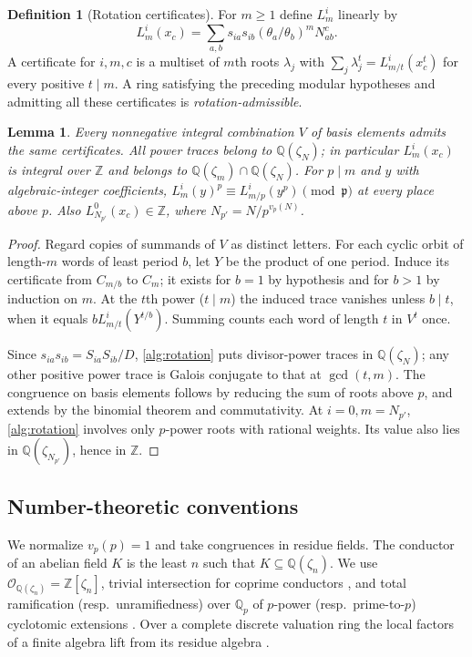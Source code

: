 \documentclass[11pt]{amsart}
\numberwithin{equation}{section}
\newtheorem{lemma}[theorem]{Lemma}
\theoremstyle{definition}
\newtheorem{definition}[theorem]{Definition}
\theoremstyle{plain}
\newcommand{\QQ}{\mathbb Q}
\newcommand{\ZZ}{\mathbb Z}
\begin{document}
\begin{definition}[Rotation certificates]\label{alg:rot-data}
For $m\ge1$ define $L_m^i$ linearly by
\begin{equation}\label{alg:rotation}
 L_m^i(x_c)=\sum_{a,b}s_{ia}s_{ib}(\theta_a/\theta_b)^m N_{ab}^c .
\end{equation}
A certificate for $i,m,c$ is a multiset of $m$th roots $\lambda_j$
with $\sum_j\lambda_j^t=L_{m/t}^i(x_c^t)$ for every positive $t\mid m$.
A ring satisfying the preceding modular hypotheses and admitting all
these certificates is \emph{rotation-admissible}.
\end{definition}

\begin{lemma}\label{alg:rotation-arithmetic}
Every nonnegative integral combination $V$ of basis elements admits
the same certificates. All power traces belong to $\QQ(\zeta_N)$;
in particular $L_m^i(x_c)$ is integral over $\ZZ$ and belongs to
$\QQ(\zeta_m)\cap\QQ(\zeta_N)$. For $p\mid m$ and $y$ with
algebraic-integer coefficients,
$L_m^i(y)^p\equiv L_{m/p}^i(y^p)\pmod{\mathfrak p}$ at every place
above $p$. Also $L_{N_{p'}}^0(x_c)\in\ZZ$, where
$N_{p'}=N/p^{v_p(N)}$.
\end{lemma}
\begin{proof}
Regard copies of summands of $V$ as distinct letters. For each cyclic
orbit of length-$m$ words of least period $b$, let $Y$ be the product
of one period. Induce its certificate from $C_{m/b}$ to $C_m$; it
exists for $b=1$ by hypothesis and for $b>1$ by induction on $m$.
At the $t$th power ($t\mid m$) the induced trace vanishes unless
$b\mid t$, when it equals $bL_{m/t}^i(Y^{t/b})$. Summing counts each
word of length $t$ in $V^t$ once.

Since $s_{ia}s_{ib}=S_{ia}S_{ib}/D$, \eqref{alg:rotation} puts
divisor-power traces in $\QQ(\zeta_N)$; any other positive power
trace is Galois conjugate to that at $\gcd(t,m)$. The congruence on
basis elements follows by reducing the sum of roots above $p$, and
extends by the binomial theorem and commutativity. At $i=0,m=N_{p'}$,
\eqref{alg:rotation} involves only $p$-power roots with rational
weights. Its value also lies in $\QQ(\zeta_{N_{p'}})$, hence in $\ZZ$.
\end{proof}

\subsection{Number-theoretic conventions}\label{alg:arithmetic}
We normalize $v_p(p)=1$ and take congruences in residue fields.
The conductor of an abelian field $K$ is the least $n$ such that
$K\subseteq\QQ(\zeta_n)$. We use $\mathcal O_{\QQ(\zeta_n)}=\ZZ[\zeta_n]$,
trivial intersection for coprime conductors
\cite[Ch.~2, Theorem~2.6]{Washington}, and total ramification
(resp.\ unramifiedness) over $\QQ_p$ of $p$-power (resp.\ prime-to-$p$)
cyclotomic extensions \cite[Ch.~IV, \S4]{SerreLocal}. Over a complete
discrete valuation ring the local factors of a finite algebra lift
from its residue algebra \cite[Tag 04GH]{Stacks}.
\end{document}
